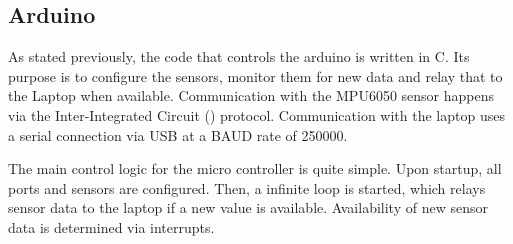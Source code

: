 \subsection{Arduino}
\label{subsec:arduino}

As stated previously, the code that controls the arduino is written in C.
Its purpose is to configure the sensors, monitor them for new data and relay that to the Laptop when available.
Communication with the MPU6050 sensor happens via the Inter-Integrated Circuit (\IIC) protocol.
Communication with the laptop uses a serial connection via USB at a BAUD rate of 250000.


The main control logic for the micro controller is quite simple. Upon startup, all ports and sensors are configured.
Then, a infinite loop is started, which relays sensor data to the laptop if a new value is available.
Availability of new sensor data is determined via interrupts.